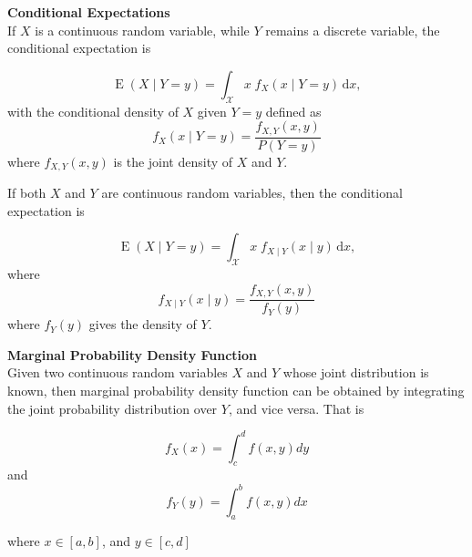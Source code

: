 \begin{framed}
\large
\noindent \textbf{Conditional Expectations}\\

\noindent If $X$ is a continuous random variable, while $Y$ remains a discrete variable, the conditional expectation is

\[{\displaystyle \operatorname {E} (X\mid Y=y)=\int _{\mathcal {X}}x\;f_{X}(x\mid Y=y)\,\mathrm {d} x,}\]
with the conditional density of $X$ given $Y = y$ defined as \[{\displaystyle f_{X}(x\mid Y=y)={\frac {f_{X,Y}(x,y)}{P(Y=y)}}}\] where $f_{X,Y}(x, y)$ is the joint density of $X$ and $Y$. 

\bigskip  

\noindent If both $X$ and $Y$ are continuous random variables, then the conditional expectation is

\[{\displaystyle \operatorname {E} (X\mid Y=y)=\int _{\mathcal {X}}x\;f_{X\mid Y}(x\mid y)\,\mathrm {d} x,}\]
where \[{\displaystyle f_{X\mid Y}(x\mid y)={\frac {f_{X,Y}(x,y)}{f_{Y}(y)}}}\] where $f_{Y}(y)$ gives the density of $Y$.

\end{framed}


\begin{framed}
\large
\noindent \textbf{Marginal Probability Density Function}\\
Given two continuous random variables $X$ and $Y$ whose joint distribution is known, then marginal probability density function can be obtained by integrating the joint probability distribution over $Y$, and vice versa. That is

\[{\displaystyle f_{X}(x)=\int _{c}^{d}f(x,y)dy}\] and \[{\displaystyle f_{Y}(y)=\int _{a}^{b}f(x,y)dx}\]

\noindent where ${\displaystyle x\in [a,b]}$, and ${\displaystyle y\in [c,d]}$
\end{framed}